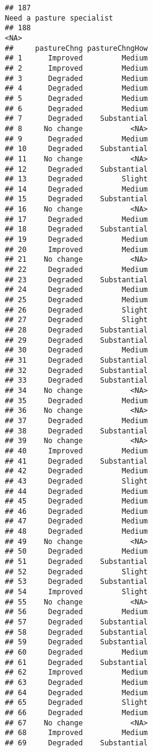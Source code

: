 \documentclass[
]{article}
\begin{document}
\begin{verbatim}
## 187                                                                                    Need a pasture specialist
## 188                                                                                                         <NA>
##     pastureChng pastureChngHow
## 1      Improved         Medium
## 2      Improved         Medium
## 3      Degraded         Medium
## 4      Degraded         Medium
## 5      Degraded         Medium
## 6      Degraded         Medium
## 7      Degraded    Substantial
## 8     No change           <NA>
## 9      Degraded         Medium
## 10     Degraded    Substantial
## 11    No change           <NA>
## 12     Degraded    Substantial
## 13     Degraded         Slight
## 14     Degraded         Medium
## 15     Degraded    Substantial
## 16    No change           <NA>
## 17     Degraded         Medium
## 18     Degraded    Substantial
## 19     Degraded         Medium
## 20     Improved         Medium
## 21    No change           <NA>
## 22     Degraded         Medium
## 23     Degraded    Substantial
## 24     Degraded         Medium
## 25     Degraded         Medium
## 26     Degraded         Slight
## 27     Degraded         Slight
## 28     Degraded    Substantial
## 29     Degraded    Substantial
## 30     Degraded         Medium
## 31     Degraded    Substantial
## 32     Degraded    Substantial
## 33     Degraded    Substantial
## 34    No change           <NA>
## 35     Degraded         Medium
## 36    No change           <NA>
## 37     Degraded         Medium
## 38     Degraded    Substantial
## 39    No change           <NA>
## 40     Improved         Medium
## 41     Degraded    Substantial
## 42     Degraded         Medium
## 43     Degraded         Slight
## 44     Degraded         Medium
## 45     Degraded         Medium
## 46     Degraded         Medium
## 47     Degraded         Medium
## 48     Degraded         Medium
## 49    No change           <NA>
## 50     Degraded         Medium
## 51     Degraded    Substantial
## 52     Degraded         Slight
## 53     Degraded    Substantial
## 54     Improved         Slight
## 55    No change           <NA>
## 56     Degraded         Medium
## 57     Degraded    Substantial
## 58     Degraded    Substantial
## 59     Degraded    Substantial
## 60     Degraded         Medium
## 61     Degraded    Substantial
## 62     Improved         Medium
## 63     Degraded         Medium
## 64     Degraded         Medium
## 65     Degraded         Slight
## 66     Degraded         Medium
## 67    No change           <NA>
## 68     Improved         Medium
## 69     Degraded    Substantial

\end{verbatim}
\end{document}
